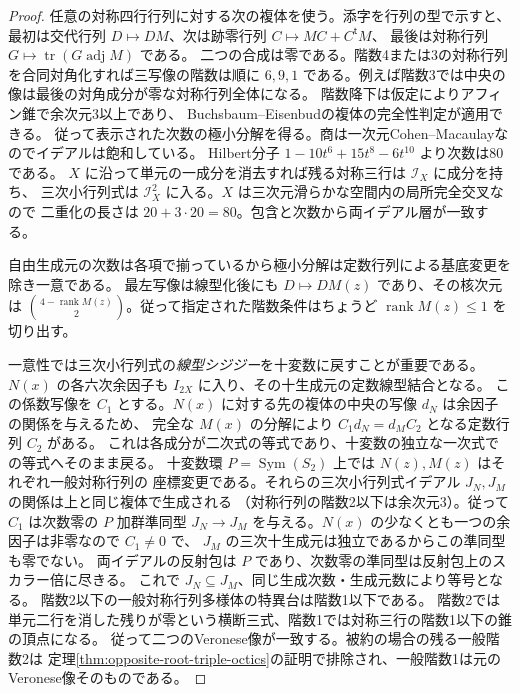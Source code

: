 \begin{proof}
任意の対称四行行列に対する次の複体を使う。添字を行列の型で示すと、
最初は交代行列 $D\mapsto DM$、次は跡零行列 $C\mapsto MC+C^{\mathsf t}M$、
最後は対称行列 $G\mapsto\operatorname{tr}(G\operatorname{adj}M)$ である。
二つの合成は零である。階数4または3の対称行列を合同対角化すれば三写像の階数は順に
$6,9,1$ である。例えば階数3では中央の像は最後の対角成分が零な対称行列全体になる。
階数降下は仮定によりアフィン錐で余次元3以上であり、
Buchsbaum--Eisenbudの複体の完全性判定が適用できる。
従って表示された次数の極小分解を得る。商は一次元Cohen--Macaulayなのでイデアルは飽和している。
Hilbert分子 $1-10t^6+15t^8-6t^{10}$ より次数は80である。
$X$ に沿って単元の一成分を消去すれば残る対称三行は $\mathcal I_X$ に成分を持ち、
三次小行列式は $\mathcal I_X^2$ に入る。$X$ は三次元滑らかな空間内の局所完全交叉なので
二重化の長さは $20+3\cdot20=80$。包含と次数から両イデアル層が一致する。

自由生成元の次数は各項で揃っているから極小分解は定数行列による基底変更を除き一意である。
最左写像は線型化後にも $D\mapsto D M(z)$ であり、その核次元は
$\binom{4-\operatorname{rank}M(z)}2$。従って指定された階数条件はちょうど
$\operatorname{rank}M(z)\le1$ を切り出す。

一意性では三次小行列式の\emph{線型シジジー}を十変数に戻すことが重要である。
$N(x)$ の各六次余因子も $I_{2X}$ に入り、その十生成元の定数線型結合となる。
この係数写像を $C_1$ とする。$N(x)$ に対する先の複体の中央の写像 $d_N$ は余因子の関係を与えるため、
完全な $M(x)$ の分解により $C_1 d_N=d_M C_2$ となる定数行列 $C_2$ がある。
これは各成分が二次式の等式であり、十変数の独立な一次式での等式へそのまま戻る。
十変数環 $P=\operatorname{Sym}(S_2)$ 上では $N(z),M(z)$ はそれぞれ一般対称行列の
座標変更である。それらの三次小行列式イデアル $J_N,J_M$ の関係は上と同じ複体で生成される
（対称行列の階数2以下は余次元3）。従って $C_1$ は次数零の $P$ 加群準同型
$J_N\to J_M$ を与える。$N(x)$ の少なくとも一つの余因子は非零なので $C_1\ne0$ で、
$J_M$ の三次十生成元は独立であるからこの準同型も零でない。
両イデアルの反射包は $P$ であり、次数零の準同型は反射包上のスカラー倍に尽きる。
これで $J_N\subseteq J_M$、同じ生成次数・生成元数により等号となる。
階数2以下の一般対称行列多様体の特異台は階数1以下である。
階数2では単元二行を消した残りが零という横断三式、階数1では対称三行の階数1以下の錐の頂点になる。
従って二つのVeronese像が一致する。被約の場合の残る一般階数2は
定理\ref{thm:opposite-root-triple-octics}の証明で排除され、一般階数1は元のVeronese像そのものである。
\end{proof}

